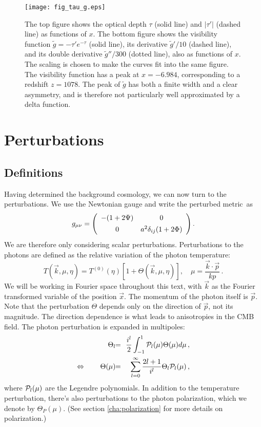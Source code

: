 \documentclass[twocolumn,nofootinbib,amsmath,amssymb]{revtex4}
\newcommand{\be}{\begin{equation}}
\newcommand{\ee}{\end{equation}}
\newcommand{\ba}{\begin{eqnarray}}
\newcommand{\ea}{\end{eqnarray}}
\newcommand{\hs}{\hspace{-1.12mm}}
\newcommand{\eq}{\hs & = & \hs}
\newcommand{\vs}{\vspace{1.5mm}}
\begin{document}
\begin{figure}[!h]
  \begin{center}
    \texttt{[image: fig\_tau\_g.eps]}
  \end{center}
  \vspace{-6mm}
  \caption{The top figure shows the optical depth $\tau$ (solid line)
  and $|\tau'|$ (dashed line) as functions of $x$. The bottom figure
  shows the visibility function $\tilde{g} = -\tau' e^{-\tau}$
  (solid line), its derivative $\tilde{g}'/10$ (dashed line), and its double
  derivative $\tilde{g}''/300$ (dotted line), also as functions of $x$. The
  scaling is chosen to make the curves fit into the same figure. The visibility
  function has a peak at $x = -6.984$, corresponding to a redshift $z = 1078$.
  The peak of $\tilde{g}$ has both a finite width and a clear asymmetry, and is
  therefore not particularly well approximated by a delta function.}
  \label{fig:tau_g}
\end{figure}


\section{Perturbations}
\label{cha:perturbations}

\subsection{Definitions}

Having determined the background cosmology, we can now turn to the
perturbations. We use the Newtonian gauge and write the perturbed metric~as
\be
  g_{\mu\nu} = \left( \begin{array}{cc}
    -(1 + 2\Psi) & 0 \vs \\
    0 & a^2 \delta_{ij} (1 + 2\Phi)
  \end{array} \right) .
\ee
We are therefore only considering scalar perturbations. Perturbations to the
photons are defined as the relative variation of the photon temperature:
\be
  T(\vec{k}, \mu, \eta) = T^{(0)}(\eta) \left[
    1 + \Theta(\vec{k}, \mu, \eta)
  \right] , \quad \mu = \frac{\vec{k}\cdot\vec{p}}{kp} \, .
\ee
We will be working in Fourier space throughout this text, with $\vec{k}$ as the
Fourier transformed variable of the position $\vec{x}$. The momentum of the
photon itself is $\vec{p}$. Note that the perturbation $\Theta$ depends only on
the direction of $\vec{p}$, not its magnitude. The direction dependence is what
leads to anisotropies in the CMB field. The photon perturbation is expanded in
multipoles:
\ba
  \Theta_l \eq \frac{i^l}{2} \int_{-1}^1 {\cal P}_l(\mu) \Theta(\mu) d\mu \, ,
    \nonumber \\
  \Leftrightarrow \qquad \Theta(\mu) \eq
    \sum_{l=0}^\infty \frac{2l+1}{i^l} \Theta_l {\cal P}_l(\mu) \, ,
\ea
where ${\cal P}_l(\mu)$ are the Legendre polynomials. In addition to the
temperature perturbation, there's also perturbations to the photon
polarization, which we denote by $\Theta_P(\mu)$. (See section
\ref{cha:polarization} for more details on polarization.)
\end{document}
